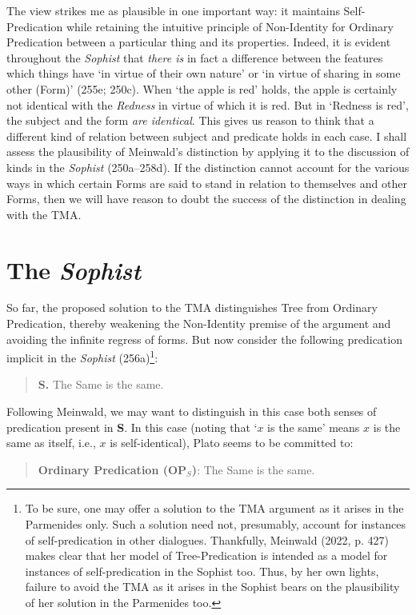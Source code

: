 The view strikes me as plausible in one important way: it maintains Self-Predication while retaining the intuitive principle of Non-Identity for Ordinary Predication between a particular thing and its properties. Indeed, it is evident throughout the \textit{Sophist} that \textit{there is} in fact a difference between the features which things have `in virtue of their own nature' or `in virtue of sharing in some other (Form)' (255e; 250c). When `the apple is red' holds, the apple is certainly not identical with the \textit{Redness} in virtue of which it is red. But in `Redness is red', the subject and the form \textit{are identical}. This gives us reason to think that a different kind of relation between subject and predicate holds in each case. I shall assess the plausibility of Meinwald's distinction by applying it to the discussion of kinds in the \textit{Sophist} (250a--258d). If the distinction cannot account for the various ways in which certain Forms are said to stand in relation to themselves and other Forms, then we will have reason to doubt the success of the distinction in dealing with the TMA. 

\section{The \textit{Sophist}}

So far, the proposed solution to the TMA distinguishes Tree from Ordinary Predication, thereby weakening the Non-Identity premise of the argument and avoiding the infinite regress of forms. But now consider the following predication implicit in the \textit{Sophist} (256a)\footnote{To be sure, one may offer a solution to the TMA argument as it arises in the Parmenides only. Such a solution need not, presumably, account for instances of self-predication in other dialogues. Thankfully, Meinwald (2022, p. 427) makes clear that her model of Tree-Predication is intended as a model for instances of self-predication in the Sophist too. Thus, by her own lights, failure to avoid the TMA as it arises in the Sophist bears on the plausibility of her solution in the Parmenides too.}:
\begin{quote}
\textbf{S.} The Same is the same.
\end{quote}

\noindent Following Meinwald, we may want to distinguish in this case both senses of predication present in \textbf{S}. In this case (noting that `$x$ is the same' means $x$ is the same as itself, i.e., $x$ is self-identical), Plato seems to be committed to: 
\begin{quote}
\textbf{Ordinary Predication (OP$_S$)}: The Same is the same.
\end{quote}

